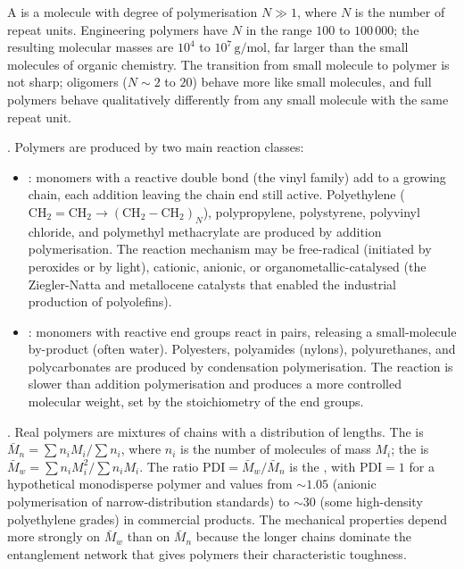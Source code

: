 A  is a molecule with degree of polymerisation
$N \gg 1$, where $N$ is the number of repeat units. Engineering
polymers have $N$ in the range $100$ to $100\,000$; the resulting
molecular masses are $10^4$ to $10^7\,\text{g}/\text{mol}$, far larger
than the small molecules of organic chemistry. The transition from
small molecule to polymer is not sharp; oligomers ($N \sim 2$ to
$20$) behave more like small molecules, and full polymers behave
qualitatively differently from any small molecule with the same
repeat unit.

. Polymers are produced by two main reaction
classes:

\begin{itemize}[leftmargin=*]
\item {}: monomers with
  a reactive double bond (the vinyl family) add to a growing chain,
  each addition leaving the chain end still active. Polyethylene
  ($\text{CH}_2=\text{CH}_2 \to (\text{CH}_2-\text{CH}_2)_N$),
  polypropylene, polystyrene, polyvinyl chloride, and polymethyl
  methacrylate are produced by addition polymerisation. The reaction
  mechanism may be free-radical (initiated by peroxides or by light),
  cationic, anionic, or organometallic-catalysed (the Ziegler-Natta
  and metallocene catalysts that enabled the industrial production
  of polyolefins).
\item {}: monomers
  with reactive end groups react in pairs, releasing a small-molecule
  by-product (often water). Polyesters, polyamides (nylons),
  polyurethanes, and polycarbonates are produced by condensation
  polymerisation. The reaction is slower than addition polymerisation
  and produces a more controlled molecular weight, set by the
  stoichiometry of the end groups.
\end{itemize}

. Real polymers are mixtures of
chains with a distribution of lengths. The  is $\bar{M}_n = \sum n_i M_i / \sum n_i$, where
$n_i$ is the number of molecules of mass $M_i$; the
 is $\bar{M}_w = \sum n_i
M_i^2 / \sum n_i M_i$. The ratio $\text{PDI} = \bar{M}_w/\bar{M}_n$ is
the , with $\text{PDI} = 1$ for a
hypothetical monodisperse polymer and values from $\sim 1.05$ (anionic
polymerisation of narrow-distribution standards) to $\sim 30$ (some
high-density polyethylene grades) in commercial products. The
mechanical properties depend more strongly on $\bar{M}_w$ than on
$\bar{M}_n$ because the longer chains dominate the entanglement
network that gives polymers their characteristic toughness.

